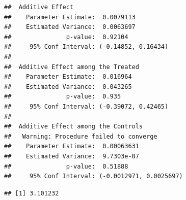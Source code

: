 \documentclass[
]{book}
\newenvironment{Shaded}{\begin{snugshade}}{\end{snugshade}}
\newcommand{\AttributeTok}[1]{\textcolor[rgb]{0.77,0.63,0.00}{#1}}
\newcommand{\CommentTok}[1]{\textcolor[rgb]{0.56,0.35,0.01}{\textit{#1}}}
\newcommand{\DecValTok}[1]{\textcolor[rgb]{0.00,0.00,0.81}{#1}}
\newcommand{\FunctionTok}[1]{\textcolor[rgb]{0.00,0.00,0.00}{#1}}
\newcommand{\NormalTok}[1]{#1}
\newcommand{\OtherTok}[1]{\textcolor[rgb]{0.56,0.35,0.01}{#1}}
\newcommand{\SpecialCharTok}[1]{\textcolor[rgb]{0.00,0.00,0.00}{#1}}
\newcommand{\StringTok}[1]{\textcolor[rgb]{0.31,0.60,0.02}{#1}}
\begin{document}
\begin{Shaded}
\end{Shaded}

\begin{verbatim}
##  Additive Effect
##    Parameter Estimate:  0.0079113
##    Estimated Variance:  0.0063697
##               p-value:  0.92104
##     95% Conf Interval: (-0.14852, 0.16434) 
## 
##  Additive Effect among the Treated
##    Parameter Estimate:  0.016964
##    Estimated Variance:  0.043265
##               p-value:  0.935
##     95% Conf Interval: (-0.39072, 0.42465) 
## 
##  Additive Effect among the Controls
##   Warning: Procedure failed to converge
##    Parameter Estimate:  0.00063631
##    Estimated Variance:  9.7303e-07
##               p-value:  0.51888
##     95% Conf Interval: (-0.0012971, 0.0025697)
\end{verbatim}

\begin{Shaded}
\end{Shaded}

\begin{verbatim}
## [1] 3.101232
\end{verbatim}
\end{document}
